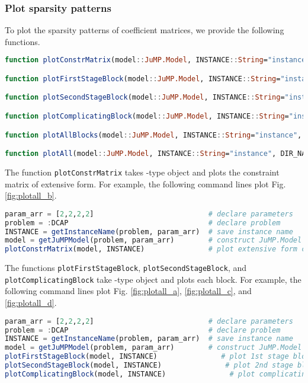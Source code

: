 \subsubsection{Plot sparsity patterns}
To plot the sparsity patterns of coefficient matrices, we provide the following functions.
\begin{lstlisting}[frame=single,language=julia]
function plotConstrMatrix(model::JuMP.Model, INSTANCE::String="instance", DIR_NAME::String="$(dirname(@__FILE__))/../plot")

function plotFirstStageBlock(model::JuMP.Model, INSTANCE::String="instance_block_A", DIR_NAME::String="$(dirname(@__FILE__))/../plot")

function plotSecondStageBlock(model::JuMP.Model, INSTANCE::String="instance_block_W", DIR_NAME::String="$(dirname(@__FILE__))/../plot")

function plotComplicatingBlock(model::JuMP.Model, INSTANCE::String="instance_block_T", DIR_NAME::String="$(dirname(@__FILE__))/../plot")

function plotAllBlocks(model::JuMP.Model, INSTANCE::String="instance", DIR_NAME::String="$(dirname(@__FILE__))/../plot")

function plotAll(model::JuMP.Model, INSTANCE::String="instance", DIR_NAME::String="$(dirname(@__FILE__))/../plot")
\end{lstlisting}
The function \texttt{plotConstrMatrix} takes \jumpmodel-type object and plots the constraint matrix of extensive form. For example, the following command lines plot Fig. \ref{fig:plotall_b}.
\begin{lstlisting}[frame=single,language=julia]
param_arr = [2,2,2,2]	                        # declare parameters
problem = :DCAP	                                # declare problem
INSTANCE = getInstanceName(problem, param_arr)	# save instance name
model = getJuMPModel(problem, param_arr)	    # construct JuMP.Model object
plotConstrMatrix(model, INSTANCE)               # plot extensive form constraint matrix   
\end{lstlisting}

The functions \texttt{plotFirstStageBlock}, \texttt{plotSecondStageBlock}, and \texttt{plotComplicatingBlock} take \jumpmodel-type object and plots each block. For example, the following command lines plot Fig. \ref{fig:plotall_a}, \ref{fig:plotall_c}, and \ref{fig:plotall_d}.
\begin{lstlisting}[frame=single,language=julia]
param_arr = [2,2,2,2]	                        # declare parameters
problem = :DCAP	                                # declare problem
INSTANCE = getInstanceName(problem, param_arr)	# save instance name
model = getJuMPModel(problem, param_arr)	    # construct JuMP.Model object
plotFirstStageBlock(model, INSTANCE)               # plot 1st stage block
plotSecondStageBlock(model, INSTANCE)               # plot 2nd stage block
plotComplicatingBlock(model, INSTANCE)               # plot complicating block
\end{lstlisting}

